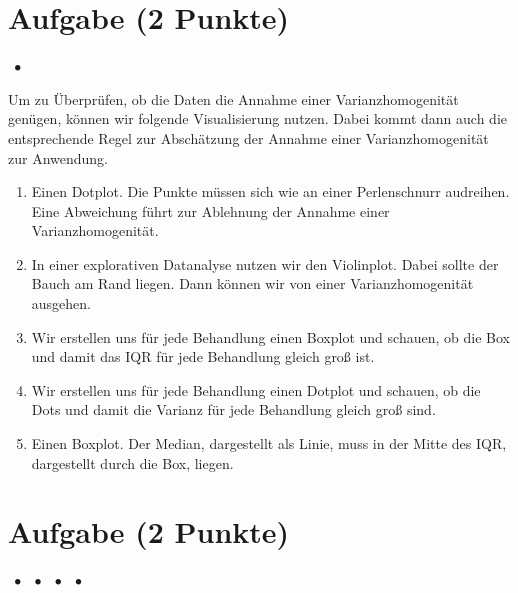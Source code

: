 \documentclass[a4paper, 9pt]{scrartcl}\usepackage[]{graphicx}\usepackage[]{xcolor}
\begin{document}
{\small

\section{Aufgabe \hfill (2 Punkte)}


\ifcollection
\begin{flushright}
\tiny\vspace{-2Ex}
\textbf{\examinhaltstart}
\exammodulestatversuch $\;\bullet$
\exammodulebiostat
\vspace{-1Ex}
\end{flushright}
\fi




Um zu Überprüfen, ob die Daten die Annahme einer Varianzhomogenität genügen, können wir folgende Visualisierung nutzen. Dabei kommt dann auch die entsprechende Regel zur Abschätzung der Annahme einer Varianzhomogenität zur Anwendung.



\begin{enumerate}
\item [\textbf{A} \msquare] Einen Dotplot. Die Punkte müssen sich wie an einer Perlenschnurr audreihen. Eine Abweichung führt zur Ablehnung der Annahme einer Varianzhomogenität.
\item [\textbf{B} \msquare] In einer explorativen Datanalyse nutzen wir den Violinplot. Dabei sollte der Bauch am Rand liegen. Dann können wir von einer Varianzhomogenität ausgehen.
\item [\textbf{C} \msquare] Wir erstellen uns für jede Behandlung einen Boxplot und schauen, ob die Box und damit das IQR für jede Behandlung gleich groß ist.
\item [\textbf{D} \msquare] Wir erstellen uns für jede Behandlung einen Dotplot und schauen, ob die Dots und damit die Varianz für jede Behandlung gleich groß sind.
\item [\textbf{E} \msquare] Einen Boxplot. Der Median, dargestellt als Linie, muss in der Mitte des IQR, dargestellt durch die Box, liegen.
\end{enumerate} 

\section{Aufgabe \hfill (2 Punkte)}

\ifcollection
\begin{flushright}
\tiny\vspace{-2Ex}
\textbf{\examinhaltstart}
\exammodulemathstat $\;\bullet$
\exammodulestat $\;\bullet$
\exammodulestatbbv $\;\bullet$
\exammodulestatversuch $\;\bullet$
\exammodulebiostat
\vspace{-1Ex}
\end{flushright}
\fi




}
\end{document}
